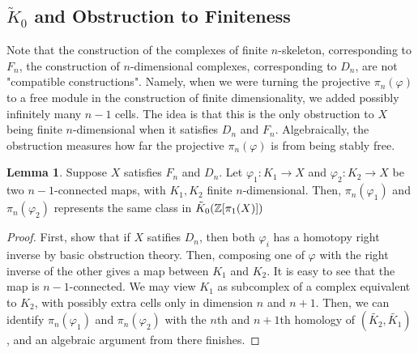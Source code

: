 \documentclass{article}
\theoremstyle{definition}
\theoremstyle{definition}
\theoremstyle{definition}
\theoremstyle{definition}
\theoremstyle{definition}
\newtheorem{lemma}[theorem]{Lemma}
\theoremstyle{definition}
\theoremstyle{definition}
\begin{document}
\subsection{$\tilde{K}_0$ and Obstruction to Finiteness}


Note that the construction of the complexes of finite $n$-skeleton, corresponding to $F_n$, the construction of $n$-dimensional complexes, corresponding to $D_n$, are not "compatible constructions". Namely, when we were turning the projective $\pi_n(\varphi)$ to a free module in the construction of finite dimensionality, we added possibly infinitely many $n-1$ cells. The idea is that this is the only obstruction to $X$ being finite $n$-dimensional when it satisfies $D_n$ and $F_n$. Algebraically, the obstruction measures how far the projective $\pi_n(\varphi)$ is from being stably free.

\begin{tcolorbox}
\begin{lemma}
Suppose $X$ satisfies $F_n$ and $D_n$. Let $\varphi_1: K_1\to X$ and $\varphi_2: K_2\to X$ be two $n-1$-connected maps, with $K_1,K_2$ finite $n$-dimensional. Then, $\pi_n(\varphi_1)$ and $\pi_n(\varphi_2)$ represents the same class in $\Tilde{K}_0(\mathbb{Z}[\pi_1(X)])$
\end{lemma}
\end{tcolorbox}
\begin{proof}
  First, show that if $X$ satifies $D_n$, then both $\varphi_i$ has a homotopy right inverse by basic obstruction theory. Then, composing one of $\varphi$ with the right inverse of the other gives a map between $K_1$ and $K_2$. It is easy to see that the map is $n-1$-connected. We may view $K_1$ as subcomplex of a complex equivalent to $K_2$, with possibly extra cells only in dimension $n$ and $n+1$. Then, we can identify $\pi_n(\varphi_1)$ and $\pi_n(\varphi_2)$ with the $n$th and $n+1$th homology of $(\tilde{K_2},\tilde{K_1})$, and an algebraic argument from there finishes. 
\end{proof}
\end{document}
